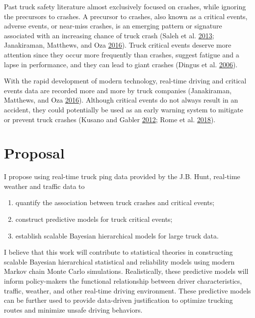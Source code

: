 \documentclass[12pt]{book}
\numberwithin{equation}{chapter}
\providecommand{\tightlist}{%
  \setlength{\itemsep}{0pt}\setlength{\parskip}{0pt}}
\begin{document}
Past truck safety literature almost exclusively focused on crashes, while ignoring the precursors to crashes. A precursor to crashes, also known as a critical events, adverse events, or near-miss crashes, is an emerging pattern or signature associated with an increasing chance of truck crash (Saleh et al. \protect\hyperlink{ref-saleh2013accident}{2013}; Janakiraman, Matthews, and Oza \protect\hyperlink{ref-janakiraman2016discovery}{2016}). Truck critical events deserve more attention since they occur more frequently than crashes, suggest fatigue and a lapse in performance, and they can lead to giant crashes (Dingus et al. \protect\hyperlink{ref-dingus2006development}{2006}).

With the rapid development of modern technology, real-time driving and critical events data are recorded more and more by truck companies (Janakiraman, Matthews, and Oza \protect\hyperlink{ref-janakiraman2016discovery}{2016}). Although critical events do not always result in an accident, they could potentially be used as an early warning system to mitigate or prevent truck crashes (Kusano and Gabler \protect\hyperlink{ref-kusano2012safety}{2012}; Rome et al. \protect\hyperlink{ref-de2018near}{2018}).

\hypertarget{proposal}{%
\section{Proposal}\label{proposal}}

I propose using real-time truck ping data provided by the J.B. Hunt, real-time weather and traffic data to

\begin{enumerate}
\def\labelenumi{\arabic{enumi})}
\tightlist
\item
  quantify the association between truck crashes and critical events;
\item
  construct predictive models for truck critical events;
\item
  establish scalable Bayesian hierarchical models for large truck data.
\end{enumerate}

I believe that this work will contribute to statistical theories in constructing scalable Bayesian hierarchical statistical and reliability models using modern Markov chain Monte Carlo simulations. Realistically, these predictive models will inform policy-makers the functional relationship between driver characteristics, traffic, weather, and other real-time driving environment. These predictive models can be further used to provide data-driven justification to optimize trucking routes and minimize unsafe driving behaviors.
\end{document}
